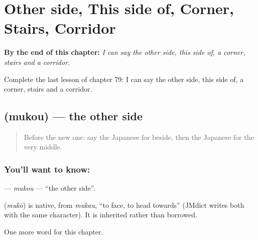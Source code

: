 
\chapter{Other side, This side of, Corner, Stairs, Corridor}
\label{ch:ja-other-side-this-side-of-corner-stairs-corridor}

\begin{chapteropening}
\textbf{By the end of this chapter:} \emph{I can say the other side, this side of, a corner, stairs and a corridor.}

Complete the last lesson of chapter 79: I can say the other side, this side of, a corner, stairs and a corridor.
\end{chapteropening}

\section[\texorpdfstring{\ja{むこう} (mukou)}{むこう (mukou)}]{ (mukou) — the other side}

\label{lesson:JA-C79-mukou}



\begin{quote}
Before the new one: say the Japanese for beside, then the Japanese for the very middle.
\end{quote}

\subsection*{You'll want to know: }
\textbf{} — \emph{mukou} — \textquotedblleft{}the other side\textquotedblright{}.

\begin{cousinweb}
\textbf{} (\emph{mukō}) is native, from \emph{mukau}, \textquotedblleft{}to face, to head towards\textquotedblright{} (JMdict writes both with the same character). It is inherited rather than borrowed.
\end{cousinweb}

\begin{grammarlens}[title={What you've built}]
One more word for this chapter.
\end{grammarlens}

